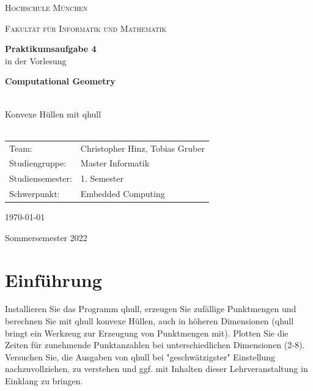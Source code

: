 \documentclass[12pt]{scrartcl}
\begin{document}
\begin{titlepage}
    \vfill
	\centering
    \vspace{1.5cm}

	{\scshape\LARGE Hochschule München \par}
    {\scshape\Large Fakultät für Informatik und Mathematik\par}
	\vspace{1.5cm}




    \vfill
    {\LARGE\bfseries Praktikumsaufgabe 4 \\}
    \vspace{0.5cm}
	{in der Vorlesung\\}
    \vspace{0.5cm}
    {\LARGE\bfseries Computational Geometry\\~\\ \par}
	{\LARGE Konvexe Hüllen mit qhull\\~\\ \par}
	\vfill
    \vfill


    \begin{tabular}{ll}
    \normalsize
    Team:  & Christopher Hinz, Tobias Gruber\\
    Studiengruppe: & Master Informatik\\
    Studiensemester: & 1. Semester\\
    Schwerpunkt: & Embedded Computing\\
    \end{tabular}
    \vspace{1.5cm}

    \today

    \vspace{0.5cm}

    Sommersemester 2022

	\vfill

\end{titlepage}

\newpage

\section{Einführung}
Installieren Sie das Programm qhull, erzeugen Sie zufällige Punktmengen und berechnen Sie mit qhull konvexe Hüllen, auch in höheren Dimensionen (qhull bringt ein Werkzeug zur Erzeugung von Punktmengen mit). Plotten Sie die Zeiten für zunehmende Punktanzahlen bei unterschiedlichen Dimensionen (2-8). Versuchen Sie, die Ausgaben von qhull bei "geschwätzigster" Einstellung nachzuvollziehen, zu verstehen und ggf. mit Inhalten dieser Lehrveranstaltung in Einklang zu bringen.
\end{document}
